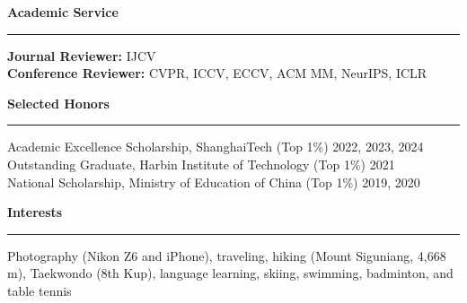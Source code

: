 \documentclass{resume}
\renewenvironment{rSection}[1]{
\sectionskip
\textcolor{DefaultBlack}{\bf #1}
\sectionlineskip
\hrule
\begin{list}{}{
\setlength{\leftmargin}{0em}
}
\item[]
}{
\end{list}
\vspace{-0.25em}
}
\begin{document}
\begin{rSection}{Academic Service}
\textbf{Journal Reviewer:} IJCV\\
\textbf{Conference Reviewer:} CVPR, ICCV, ECCV, ACM MM, NeurIPS, ICLR
\end{rSection}

\begin{rSection}{Selected Honors}
Academic Excellence Scholarship, ShanghaiTech (Top 1\%) \hfill 2022, 2023, 2024\\
Outstanding Graduate, Harbin Institute of Technology (Top 1\%) \hfill 2021\\
National Scholarship, Ministry of Education of China (Top 1\%) \hfill 2019, 2020
\end{rSection}

\begin{rSection}{Interests}
Photography (Nikon Z6 and iPhone), traveling, hiking (Mount Siguniang, 4,668 m), Taekwondo (8th Kup), language learning, skiing, swimming, badminton, and table tennis
\end{rSection}

\newpage
\end{document}
